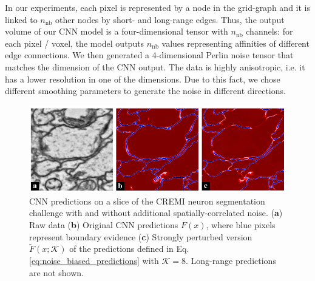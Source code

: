 In our experiments, each pixel is represented by a node in the grid-graph and it is linked to $n_{\mathrm{nb}}$ other nodes by short- and long-range edges. Thus, the output volume of our CNN model is a four-dimensional tensor with $n_{\mathrm{nb}}$ channels: for each pixel / voxel, the model outputs $n_{\mathrm{nb}}$ values representing affinities of different edge connections. We then generated a 4-dimensional Perlin noise tensor that matches the dimension of the CNN output. The data is highly anisotropic, i.e. it has a lower resolution in one of the dimensions. Due to this fact, we chose different smoothing parameters to generate the noise in different directions. 

\begin{figure}[t]
\centering
        \includegraphics[width=\textwidth,trim=0.0in -0.in -0.0in -0.4in,clip]{./figures/GASP/noisy_affs_comparison_v2.pdf}
    \caption{CNN predictions on a slice of the CREMI neuron segmentation challenge with and without additional spatially-correlated noise. (\textbf{a}) Raw data (\textbf{b}) Original CNN predictions $F(x)$, where blue pixels represent boundary evidence (\textbf{c}) Strongly perturbed version $\tilde{F}(x;\mathcal{K})$ of the predictions defined in Eq. \ref{eq:noise_biased_predictions} with $\mathcal{K}=8$. Long-range predictions are not shown. 
    }
    \label{fig:noisy_affs}
\end{figure}
